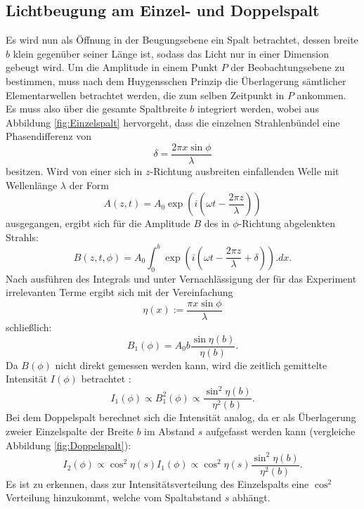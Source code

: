\subsection{Lichtbeugung am Einzel- und Doppelspalt}

Es wird nun als Öffnung in der Beugungsebene ein Spalt betrachtet, dessen breite $b$ klein gegenüber seiner Länge ist, sodass das Licht nur in einer Dimension gebeugt wird. 
Um die Amplitude in einem Punkt $P$ der Beobachtungsebene zu bestimmen, muss nach dem Huygensschen Prinzip die Überlagerung sämtlicher Elementarwellen betrachtet werden, die zum selben Zeitpunkt in $P$ ankommen. Es muss also über die gesamte Spaltbreite $b$ integriert werden, wobei aus Abbildung \ref{fig:Einzelspalt} hervorgeht, dass die einzelnen Strahlenbündel eine Phasendifferenz von 
\[
\delta = \frac{2\pi x \sin \phi}{\lambda}
\]
besitzen. Wird von einer sich in $z$-Richtung ausbreiten einfallenden Welle mit Wellenlänge $\lambda$ der Form
\[
A(z,t) = A_0\exp \left(i\left(\omega t-\frac{2\pi z}{\lambda}\right)\right)
\]
ausgegangen, ergibt sich für die Amplitude $B$ des in $\phi$-Richtung abgelenkten Strahls:
\[
B(z,t,\phi) = A_0 \int_0^b\exp\left(i\left(\omega t-\frac{2\pi z}{\lambda}+\delta\right)\right).dx\text{.}
\]
Nach ausführen des Integrals und unter Vernachlässigung der für das Experiment irrelevanten Terme ergibt sich mit der Vereinfachung
\[
\eta(x) := \frac{\pi x \sin \phi}{\lambda}
\]
schließlich:
\[
B_1(\phi) = A_0b\frac{\sin \eta(b)}{\eta(b)}\text{.}
\]
Da $B(\phi)$ nicht direkt gemessen werden kann, wird die zeitlich gemittelte Intensität $I(\phi)$ betrachtet :
\begin{equation}
I_1(\phi)\propto B^2_1(\phi) \propto \frac{\sin^2 \eta(b)}{\eta^2(b)}\text{.} \label{eq:I1}
\end{equation}
Bei dem Doppelspalt berechnet sich die Intensität analog, da er als Überlagerung zweier Einzelspalte der Breite $b$ im Abstand $s$ aufgefasst werden kann (vergleiche Abbildung \ref{fig:Doppelspalt}):
\begin{equation}
I_2(\phi) \propto \cos^2\eta(s) I_1(\phi) \propto \cos^2\eta(s)\frac{\sin^2 \eta(b)}{\eta^2(b)}\text{.}\label{eq:I2}
\end{equation}
Es ist zu erkennen, dass zur Intensitätsverteilung des Einzelspalts eine $\cos^2$ Verteilung hinzukommt, welche vom Spaltabstand $s$ abhängt.

